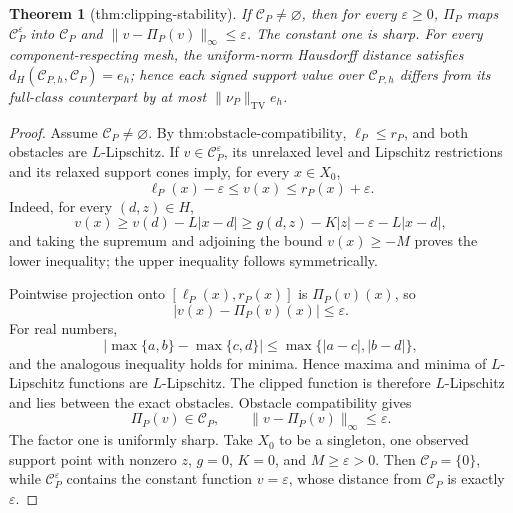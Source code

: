 \documentclass{article}
\newtheorem{theorem}{Theorem}
\begin{document}
\begin{theorem}[thm:clipping-stability]\label{thm:clipping-stability}
If \(\mathcal C_P\neq\varnothing\), then for every \(\varepsilon\ge0\), \(\Pi_P\) maps \(\mathcal C_P^{\varepsilon}\) into \(\mathcal C_P\) and \(\|v-\Pi_P(v)\|_\infty\le\varepsilon\). The constant one is sharp. For every component-respecting mesh, the uniform-norm Hausdorff distance satisfies \(d_H(\mathcal C_{P,h},\mathcal C_P)=e_h\); hence each signed support value over \(\mathcal C_{P,h}\) differs from its full-class counterpart by at most \(\|\nu_P\|_{\mathrm{TV}}e_h\).
\end{theorem}
\begin{proof}
Assume \(\mathcal C_P\neq\varnothing\).  By \(\text{thm:obstacle-compatibility}\), \(\ell_P\leq r_P\), and both obstacles are \(L\)-Lipschitz.  If \(v\in\mathcal C_P^{\varepsilon}\), its unrelaxed level and Lipschitz restrictions and its relaxed support cones imply, for every \(x\in X_0\),
\[
 \ell_P(x)-\varepsilon\leq v(x)\leq r_P(x)+\varepsilon.
\]
Indeed, for every \((d,z)\in H\),
\[
 v(x)\geq v(d)-L|x-d|
 \geq g(d,z)-K|z|-\varepsilon-L|x-d|,
\]
and taking the supremum and adjoining the bound \(v(x)\geq-M\) proves the lower inequality; the upper inequality follows symmetrically.

Pointwise projection onto \([\ell_P(x),r_P(x)]\) is \(\Pi_P(v)(x)\), so
\[
 |v(x)-\Pi_P(v)(x)|\leq\varepsilon.
\]
For real numbers,
\[
 |\max\{a,b\}-\max\{c,d\}|\leq\max\{|a-c|,|b-d|\},
\]
and the analogous inequality holds for minima.  Hence maxima and minima of \(L\)-Lipschitz functions are \(L\)-Lipschitz.  The clipped function is therefore \(L\)-Lipschitz and lies between the exact obstacles.  Obstacle compatibility gives
\[
 \Pi_P(v)\in\mathcal C_P,
 \qquad
 \|v-\Pi_P(v)\|_\infty\leq\varepsilon.
\]
The factor one is uniformly sharp.  Take \(X_0\) to be a singleton, one observed support point with nonzero \(z\), \(g=0\), \(K=0\), and \(M\geq\varepsilon>0\).  Then \(\mathcal C_P=\{0\}\), while \(\mathcal C_P^{\varepsilon}\) contains the constant function \(v=\varepsilon\), whose distance from \(\mathcal C_P\) is exactly \(\varepsilon\).


\end{proof}
\end{document}
